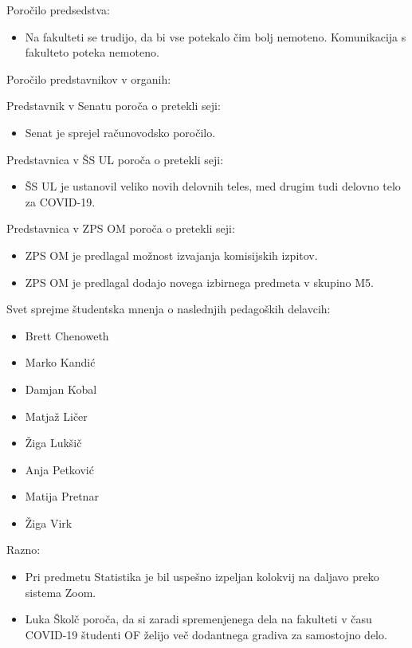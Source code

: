 \documentclass{seja}
\begin{document}
\begin{ad}
    \item
    Poročilo predsedstva:
    \begin{itemize}
        \item Na fakulteti se trudijo, da bi vse potekalo čim bolj nemoteno. Komunikacija s fakulteto poteka nemoteno.
    \end{itemize}

    \item
    Poročilo predstavnikov v organih:
    
    Predstavnik v Senatu poroča o pretekli seji: 
    \begin{itemize}
        \item Senat je sprejel računovodsko poročilo.
    \end{itemize}
    
    Predstavnica v ŠS UL poroča o pretekli seji:
    \begin{itemize}
        \item ŠS UL je ustanovil veliko novih delovnih teles, med drugim tudi delovno telo za COVID-19.
    \end{itemize}
    
    Predstavnica v ZPS OM poroča o pretekli seji:
    \begin{itemize}
        \item ZPS OM je predlagal možnost izvajanja komisijskih izpitov.
        \item ZPS OM je predlagal dodajo novega izbirnega predmeta v skupino M5.
    \end{itemize}
    
    
    \item
    Svet sprejme študentska mnenja o naslednjih pedagoških delavcih:
    \begin{itemize}
        \item Brett Chenoweth
        \item Marko Kandić
        \item Damjan Kobal
        \item Matjaž Ličer
        \item Žiga Lukšič
        \item Anja Petković
        \item Matija Pretnar
        \item Žiga Virk
    \end{itemize}

    \item
    Razno:
    \begin{itemize}
        \item Pri predmetu Statistika je bil uspešno izpeljan kolokvij na daljavo preko sistema Zoom.
        \item Luka Školč poroča, da si zaradi spremenjenega dela na fakulteti v času COVID-19 študenti OF želijo več dodantnega gradiva za samostojno delo.
    \end{itemize}
   

\end{ad}
\end{document}
